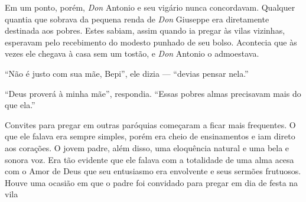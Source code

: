 \documentclass[12pt,a4paper,oneside]{book}
\begin{document}
\quad Em um ponto, porém, \emph{Don} Antonio e seu vigário nunca concordavam. Qualquer quantia que sobrava da pequena renda de \emph{Don} Giuseppe era diretamente destinada aos pobres. Estes sabiam, assim quando ia pregar às vilas vizinhas, esperavam pelo recebimento do modesto punhado de seu bolso. Acontecia que às vezes ele chegava à casa sem um tostão, e \emph{Don} Antonio o admoestava.

\quad ``Não é justo com sua mãe, Bepi'', ele dizia --- ``devias pensar nela.''

\quad ``Deus proverá à minha mãe'', respondia. ``Essas pobres almas precisavam mais do que ela.''

\quad Convites para pregar em outras paróquias começaram a ficar mais frequentes. O que ele falava era sempre simples, porém era cheio de ensinamentos e iam direto aos corações. O jovem padre, além disso, uma eloquência natural e uma bela e sonora voz. Era tão evidente que ele falava com a totalidade de uma alma acesa com o Amor de Deus que seu entusiasmo era envolvente e seus sermões frutuosos. Houve uma ocasião em que o padre foi convidado para pregar em dia de festa na vila 
\end{document}
